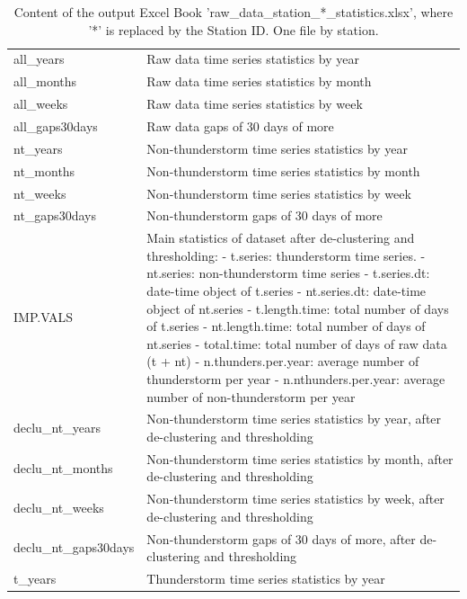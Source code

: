 \documentclass[12pt,oneside]{reedthesis}
\begin{document}
\begingroup\fontsize{8}{10}\selectfont
\begin{longtable}[t]{>{\raggedright\arraybackslash}p{1.2in}>{\raggedright\arraybackslash}p{4.6in}}
\caption[Content of raw\_data\_station\_*\_statistics.xlsx]{\label{tab:rawdatastationidstatistics}Content of the output Excel Book 'raw\_data\_station\_*\_statistics.xlsx', where '*' is replaced by the Station ID. One file by station.}\\
\toprule
\multicolumn{1}{l}{Excel Sheet Name} & \multicolumn{1}{l}{Description}\\
\midrule
all\_years & Raw data time series statistics by year\\
all\_months & Raw data time series statistics by month\\
all\_weeks & Raw data time series statistics by week\\
all\_gaps30days & Raw data gaps of 30 days of more\\
nt\_years & Non-thunderstorm time series statistics by year\\
nt\_months & Non-thunderstorm time series statistics by month\\
nt\_weeks & Non-thunderstorm time series statistics by week\\
nt\_gaps30days & Non-thunderstorm gaps of 30 days of more\\
IMP.VALS & Main statistics of dataset after de-clustering and thresholding:
- t.series: thunderstorm time series.
- nt.series: non-thunderstorm time series
- t.series.dt: date-time object of t.series
- nt.series.dt: date-time object of nt.series
- t.length.time: total number of days of t.series
- nt.length.time: total number of days of nt.series
- total.time: total number of days of raw data (t + nt)
- n.thunders.per.year: average number of thunderstorm per year
- n.nthunders.per.year: average number of non-thunderstorm per year\\
declu\_nt\_years & Non-thunderstorm time series statistics by year, after de-clustering and thresholding\\
declu\_nt\_months & Non-thunderstorm time series statistics by month, after de-clustering and thresholding\\
declu\_nt\_weeks & Non-thunderstorm time series statistics by week, after de-clustering and thresholding\\
declu\_nt\_gaps30days & Non-thunderstorm gaps of 30 days of more,  after de-clustering and thresholding\\
t\_years & Thunderstorm time series statistics by year\\

\end{longtable}
\end{document}
